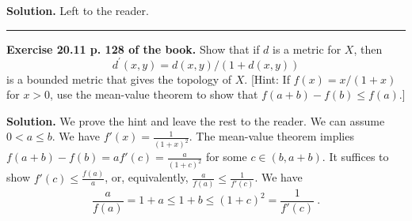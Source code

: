 \documentclass[12pt,letterpaper]{article}
\newcommand{\noi}{\noindent}%
\begin{document}
\noi\textbf{Solution.} Left to the reader. 

\bigskip\bigskip\hrule\bigskip

\noi\textbf{Exercise 20.11 p. 128 of the book.} Show that if $d$ is a metric for $X$, then
    \begin{equation*}
    d^{\prime}(x,y)=d(x,y)/(1+d(x,y))
    \end{equation*}
    is a bounded metric that gives the topology of $X$. [Hint: If $f(x)=x/(1+x)$ for $x>0$, use the mean-value theorem to show that $f(a+b)-f(b)\le f(a)$.]

\noi\textbf{Solution.} We prove the hint and leave the rest to the reader. We can assume $0<a\le b$. We have $f'(x)=\frac1{(1+x)^2}$. The mean-value theorem implies $f(a+b)-f(b)=af'(c)=\frac a{(1+c)^2}$ for some $c\in(b,a+b)$. It suffices to show $f'(c)\le\frac{f(a)}a$, or, equivalently, $\frac a{f(a)}\le\frac1{f'(c)}$. We have 
$$
\frac a{f(a)}=1+a\le1+b\le(1+c)^2=\frac1{f'(c)}\ .
$$ 
\end{document}
